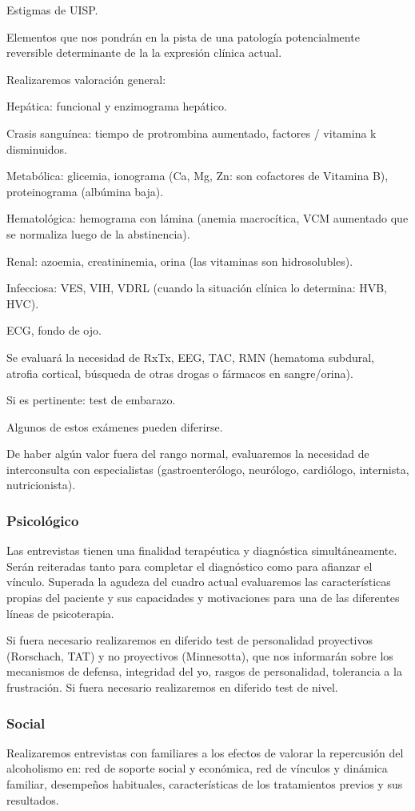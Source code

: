 Estigmas de UISP.

Elementos que nos pondrán en la pista de una patología potencialmente reversible determinante de la la expresión clínica actual.

Realizaremos valoración general:

Hepática: funcional y enzimograma hepático.

Crasis sanguínea: tiempo de protrombina aumentado, factores / vitamina k disminuidos.

Metabólica: glicemia, ionograma (Ca, Mg, Zn: son cofactores de Vitamina B), proteinograma (albúmina baja).

Hematológica: hemograma con lámina (anemia macrocítica, VCM aumentado que se normaliza luego de la abstinencia).

Renal: azoemia, creatininemia, orina (las vitaminas son hidrosolubles).

Infecciosa: VES, VIH, VDRL (cuando la situación clínica lo determina: HVB, HVC).

ECG, fondo de ojo.

Se evaluará la necesidad de RxTx, EEG, TAC, RMN (hematoma subdural, atrofia cortical, búsqueda de otras drogas o fármacos en sangre/orina).

Si es pertinente: test de embarazo.

Algunos de estos exámenes pueden diferirse.

De haber algún valor fuera del rango normal, evaluaremos la necesidad de interconsulta con especialistas (gastroenterólogo, neurólogo, cardiólogo, internista, nutricionista).

\subsubsection*{Psicológico}
Las entrevistas tienen una finalidad terapéutica y diagnóstica simultáneamente. Serán reiteradas tanto para completar el diagnóstico como para afianzar el vínculo. Superada la agudeza del cuadro actual evaluaremos las características propias del paciente y sus capacidades y motivaciones para una de las diferentes líneas de psicoterapia.

Si fuera necesario realizaremos en diferido test de personalidad proyectivos (Rorschach, TAT) y no proyectivos (Minnesotta), que nos informarán sobre los mecanismos de defensa, integridad del yo, rasgos de personalidad, tolerancia a la frustración. Si fuera necesario realizaremos en diferido test de nivel.
\subsubsection*{Social}
Realizaremos entrevistas con familiares a los efectos de valorar la repercusión del alcoholismo en: red de soporte social y económica, red de vínculos y dinámica familiar, desempeños habituales, características de los tratamientos previos y sus resultados.
